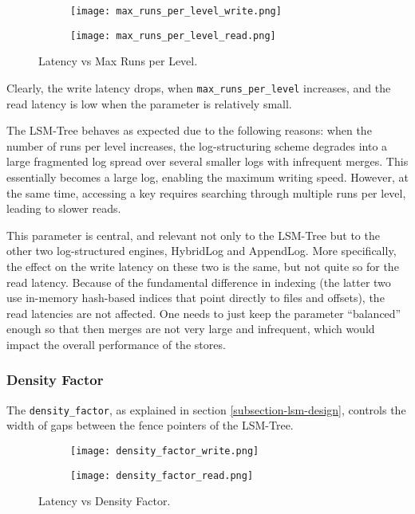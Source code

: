 \begin{figure}[H]
    \begin{subfigure}{.5\textwidth}
        \centering
        \texttt{[image: max\_runs\_per\_level\_write.png]}
    \end{subfigure}
    \begin{subfigure}{.5\textwidth}
        \centering
        \texttt{[image: max\_runs\_per\_level\_read.png]}
    \end{subfigure}
    \caption{Latency vs Max Runs per Level.}
    \label{fig:max-runs-per-level}
\end{figure}

Clearly, the write latency drops, when \verb"max_runs_per_level" increases, and the read latency is low when the parameter is relatively small.

The LSM-Tree behaves as expected due to the following reasons: when the number of runs per level increases, the log-structuring scheme degrades into a large fragmented log spread over several smaller logs with infrequent merges. This essentially becomes a large log, enabling the maximum writing speed. However, at the same time, accessing a key requires searching through multiple runs per level, leading to slower reads.

This parameter is central, and relevant not only to the LSM-Tree but to the other two log-structured engines, HybridLog and AppendLog. More specifically, the effect on the write latency on these two is the same, but not quite so for the read latency. Because of the fundamental difference in indexing (the latter two use in-memory hash-based indices that point directly to files and offsets), the read latencies are not affected. One needs to just keep the parameter ``balanced'' enough so that then merges are not very large and infrequent, which would impact the overall performance of the stores.

\subsubsection{Density Factor}
The \verb"density_factor", as explained in section \ref{subsection-lsm-design}, controls the width of gaps between the fence pointers of the LSM-Tree.

\begin{figure}[H]
    \begin{subfigure}{.5\textwidth}
        \centering
        \texttt{[image: density\_factor\_write.png]}
    \end{subfigure}
    \begin{subfigure}{.5\textwidth}
        \centering
        \texttt{[image: density\_factor\_read.png]}
    \end{subfigure}
    \caption{Latency vs Density Factor.}
    \label{fig:density_factor_write_read}
\end{figure}

